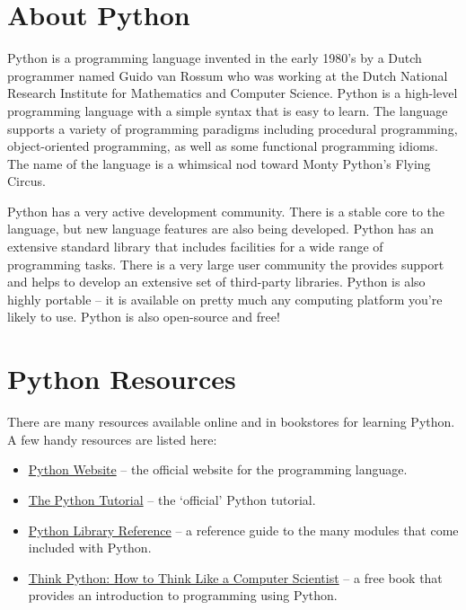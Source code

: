 
\section{About Python}

Python is a programming language invented in the early 1980's by a Dutch programmer named Guido van Rossum who was working at the Dutch National Research Institute for Mathematics and Computer Science.  Python is a high-level programming language with a simple syntax that is easy to learn. The language supports a variety of programming paradigms including procedural programming, object-oriented programming, as well as some functional programming idioms. The name of the language is a whimsical nod toward Monty Python's Flying Circus.

Python has a very active development community. There is a stable core to the language, but new language features are also being developed. Python has an extensive standard library that includes facilities for a wide range of programming tasks. There is a very large user community the provides support and helps to develop an extensive set of third-party libraries. Python is also highly portable -- it is available on pretty much any computing platform you're likely to use. Python is also open-source and free!

\section{Python Resources}

There are many resources available online and in bookstores for learning Python. A few handy resources are listed here:

\begin{itemize}
 \item \href{http://www.python.org/}{Python Website} -- the official website for the programming language.
 \item \href{http://docs.python.org/tutorial/}{The Python Tutorial} -- the `official' Python tutorial.
 \item \href{http://docs.python.org/library/}{Python Library Reference} -- a reference guide to the many modules that come included with Python.
 \item \href{http://greenteapress.com/thinkpython/thinkpython.html}{Think Python: How to Think Like a Computer Scientist} --  a free book that provides an introduction to programming using Python.
\end{itemize}


